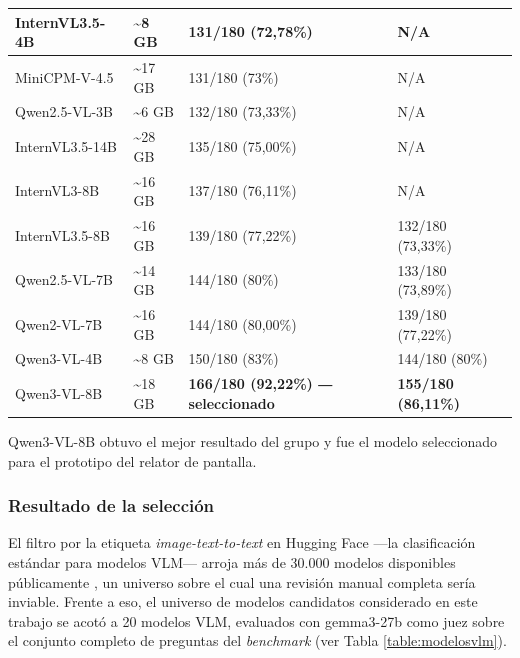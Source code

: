 \begin{longtable}{|p{3.6cm}|p{2.2cm}|p{3.6cm}|p{3.2cm}|}
    \hline
    InternVL3.5-4B & \textasciitilde{}8 GB & 131/180 (72,78\%) & N/A \\
    \hline
    MiniCPM-V-4.5 & \textasciitilde{}17 GB & 131/180 (73\%) & N/A \\
    \hline
    Qwen2.5-VL-3B & \textasciitilde{}6 GB & 132/180 (73,33\%) & N/A \\
    \hline
    InternVL3.5-14B & \textasciitilde{}28 GB & 135/180 (75,00\%) & N/A \\
    \hline
    InternVL3-8B & \textasciitilde{}16 GB & 137/180 (76,11\%) & N/A \\
    \hline
    InternVL3.5-8B & \textasciitilde{}16 GB & 139/180 (77,22\%) & 132/180 (73,33\%)\\
    \hline
    Qwen2.5-VL-7B & \textasciitilde{}14 GB & 144/180 (80\%) & 133/180 (73,89\%)\\
    \hline
    Qwen2-VL-7B & \textasciitilde{}16 GB & 144/180 (80,00\%) & 139/180 (77,22\%)\\
    \hline
    Qwen3-VL-4B & \textasciitilde{}8 GB & 150/180 (83\%) & 144/180 (80\%)\\
    \hline
    Qwen3-VL-8B & \textasciitilde{}18 GB & \textbf{166/180 (92,22\%) ― seleccionado} & \textbf{155/180 (86,11\%)}\\
    \hline
\end{longtable}

Qwen3-VL-8B obtuvo el mejor resultado del grupo y fue el modelo seleccionado para el prototipo del relator de pantalla.

\subsubsection{Resultado de la selección}

El filtro por la etiqueta \textit{image-text-to-text} en Hugging Face —la clasificación estándar para modelos VLM— arroja más de 30.000 modelos disponibles públicamente \cite{huggingface2026imagetexttotext}, un universo sobre el cual una revisión manual completa sería inviable. Frente a eso, el universo de modelos candidatos considerado en este trabajo se acotó a 20 modelos VLM, evaluados con gemma3-27b como juez sobre el conjunto completo de preguntas del \textit{benchmark} (ver Tabla \ref{table:modelosvlm}).

